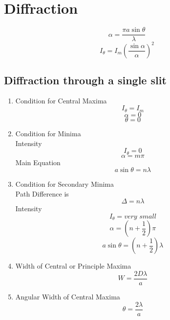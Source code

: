 \documentclass[12pt]{article}
\begin{document}
	\clearpage

\section{Diffraction}
\begin{equation}
	\alpha = \frac{\pi a \sin\theta}{\lambda}
\end{equation}
\begin{equation}
	I_\theta = I_m (\frac{\sin\alpha}{\alpha})^2
\end{equation}
\subsection{Diffraction through a single slit}
\begin{enumerate}
	\item Condition for Central Maxima
	\begin{equation}
		I_\theta = I_m
	\end{equation}
	\begin{equation}
		\alpha = 0
	\end{equation}
	\begin{equation}
		\theta = 0
	\end{equation}

 	\item Condition for Minima\\

 	Intensity
	 \begin{equation}
		I_\theta = 0
	\end{equation}
	\begin{equation}
		\alpha = m \pi
	\end{equation}
	Main Equation
	\begin{equation}
		a\sin\theta = n \lambda
	\end{equation}
  	\item Condition for Secondary Minima  \\
  	 	Path Difference is 
  	\begin{equation}
  		\Delta = n\lambda
  	\end{equation}
  Intensity
	  \begin{equation}
		I_\theta = \textit{very small}
	\end{equation}
	\begin{equation}
		\alpha = (n+\frac{1}{2}) \pi
	\end{equation}
	\begin{equation}
		a\sin\theta = (n + \frac{1}{2}) \lambda
	\end{equation}
	\item Width of Central or Principle Maxima
	\begin{equation}
		W = \frac{2 D \lambda}{a}
	\end{equation}
	\item Angular Width of Central Maxima
	\begin{equation}
		\theta = \frac{2\lambda}{a}
	\end{equation}
\end{enumerate}
\end{document}
